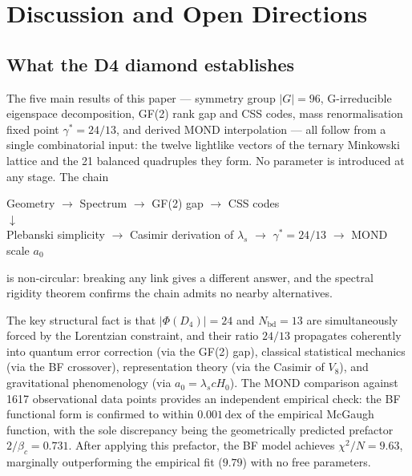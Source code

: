 \documentclass[12pt,a4paper]{article}
\theoremstyle{plain}
\theoremstyle{definition}
\newcommand{\lams}{\lambda_s}
\newcommand{\gstar}{\gamma^{*}}
\newcommand{\Nbd}{N_{\mathrm{bd}}}
\newcommand{\betac}{\beta_c}
\begin{document}
\section{Discussion and Open Directions}
\label{sec:conclusion}

\subsection{What the D4 diamond establishes}

The five main results of this paper — symmetry group $|G|=96$,
G-irreducible eigenspace decomposition, GF(2) rank gap and CSS codes,
mass renormalisation fixed point $\gstar = 24/13$, and derived MOND
interpolation — all follow from a single combinatorial input: the twelve
lightlike vectors of the ternary Minkowski lattice and the 21 balanced
quadruples they form.  No parameter is introduced at any stage.  The chain

\begin{center}
Geometry $\to$ Spectrum $\to$ GF(2) gap $\to$ CSS codes \\[4pt]
$\downarrow$\\[4pt]
Plebanski simplicity $\to$ Casimir derivation of $\lams$ $\to$
$\gstar = 24/13$ $\to$ MOND scale $a_0$
\end{center}

is non-circular: breaking any link gives a different answer, and the
spectral rigidity theorem confirms the chain admits no nearby
alternatives.

The key structural fact is that $|\Phi(D_4)| = 24$ and $\Nbd = 13$
are simultaneously forced by the Lorentzian constraint, and their ratio
$24/13$ propagates coherently into quantum error correction (via the
GF(2) gap), classical statistical mechanics (via the BF crossover),
representation theory (via the Casimir of $V_8$), and gravitational
phenomenology (via $a_0 = \lams c H_0$).  The MOND comparison against
1617 observational data points provides an independent empirical check:
the BF functional form is confirmed to within $0.001\,\mathrm{dex}$
of the empirical McGaugh function, with the sole discrepancy being
the geometrically predicted prefactor $2/\betac = 0.731$.
After applying this prefactor, the BF model achieves
$\chi^2/N = 9.63$, marginally outperforming the empirical fit ($9.79$)
with no free parameters.
\end{document}
